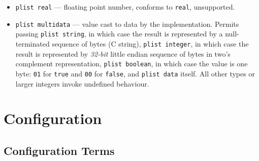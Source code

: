 \documentclass[]{article}
\begin{document}
\begin{itemize}
  integral type is explicitly mentioned in specific
  \texttt{plist\ object} description.
\item
  \texttt{plist\ real} --- floating point number, conforms to
  \texttt{real}, unsupported.
\item
  \texttt{plist\ multidata} --- value cast to data by the implementation.
  Permits passing \texttt{plist\ string}, in which case the result is
  represented by a null-terminated sequence of bytes (C string),
  \texttt{plist\ integer}, in which case the result is represented by
  \emph{32-bit} little endian sequence of bytes in two's complement
  representation, \texttt{plist\ boolean}, in which case the value is
  one byte: \texttt{01} for \texttt{true} and \texttt{00} for
  \texttt{false}, and \texttt{plist\ data} itself. All other types or
  larger integers invoke undefined behaviour.
\end{itemize}

\section{Configuration}\label{configuration-overview}

\subsection{Configuration Terms}\label{configuration-terms}
\end{document}
